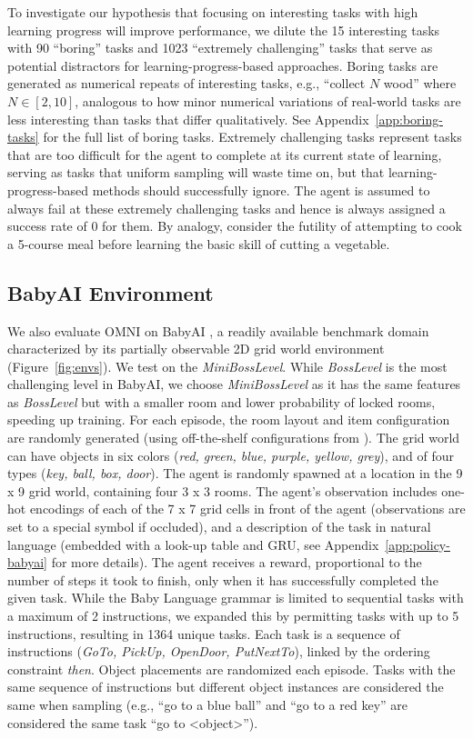 \documentclass{article} %
\begin{document}
To investigate our hypothesis that focusing on interesting tasks with high learning progress will improve performance, we dilute the 15 interesting tasks with 90 ``boring'' tasks and 1023 ``extremely challenging'' tasks that serve as potential distractors for learning-progress-based approaches. Boring tasks are generated as numerical repeats of interesting tasks, e.g., ``collect $N$ wood'' where $N \in [2, 10]$, analogous to how minor numerical variations of real-world tasks are less interesting than tasks that differ qualitatively. See Appendix~\ref{app:boring-tasks} for the full list of boring tasks. Extremely challenging tasks represent tasks that are too difficult for the agent to complete at its current state of learning, serving as tasks that uniform sampling will waste time on, but that learning-progress-based methods should successfully ignore. The agent is assumed to always fail at these extremely challenging tasks and hence is always assigned a success rate of 0 for them. By analogy, consider the futility of attempting to cook a 5-course meal before learning the basic skill of cutting a vegetable.

\subsection{BabyAI Environment}
We also evaluate OMNI on BabyAI \citep{chevalier2018babyai}, a readily available benchmark domain characterized by its partially observable 2D grid world environment (Figure~\ref{fig:envs}). We test on the \textit{MiniBossLevel}. While \textit{BossLevel} is the most challenging level in BabyAI, we choose \textit{MiniBossLevel} as it has the same features as \textit{BossLevel} but with a smaller room and lower probability of locked rooms, speeding up training. For each episode, the room layout and item configuration are randomly generated (using off-the-shelf configurations from \citet{chevalier2018babyai}). The grid world can have objects in six colors (\textit{red, green, blue, purple, yellow, grey}), and of four types (\textit{key, ball, box, door}). The agent is randomly spawned at a location in the 9 x 9 grid world, containing four 3 x 3 rooms. The agent's observation includes one-hot encodings of each of the 7 x 7 grid cells in front of the agent (observations are set to a special symbol if occluded), and a description of the task in natural language (embedded with a look-up table and GRU, see Appendix~\ref{app:policy-babyai} for more details). The agent receives a reward, proportional to the number of steps it took to finish, only when it has successfully completed the given task. While the Baby Language grammar \citep{chevalier2018babyai} is limited to sequential tasks with a maximum of 2 instructions, we expanded this by permitting tasks with up to 5 instructions, resulting in 1364 unique tasks. Each task is a sequence of instructions (\textit{GoTo, PickUp, OpenDoor, PutNextTo}), linked by the ordering constraint \textit{then}. Object placements are randomized each episode. Tasks with the same sequence of instructions but different object instances are considered the same when sampling (e.g., ``go to a blue ball'' and ``go to a red key'' are considered the same task ``go to <object>'').
\end{document}
